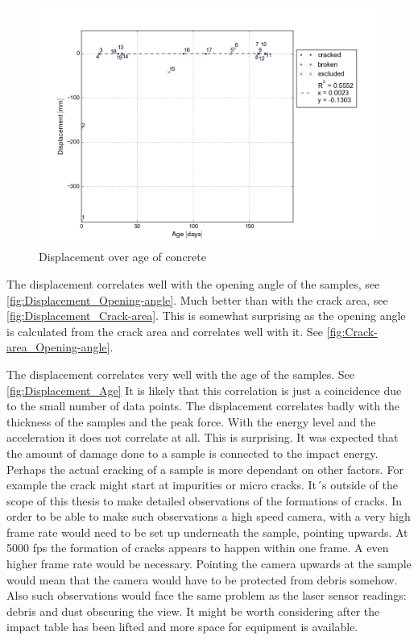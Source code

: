 \begin{figure}
    \centering
    \includegraphics[width=0.95 \linewidth]{./diagram/Displacement_Age}
    \caption{Displacement over age of concrete}
    \label{fig:Displacement_Age}
\end{figure}

The displacement correlates well with the opening angle of the samples, see \autoref{fig:Displacement_Opening-angle}. Much better than with the crack area, see \autoref{fig:Displacement_Crack-area}. This is somewhat surprising as the opening angle is calculated from the crack area and correlates well with it. See \autoref{fig:Crack-area_Opening-angle}.

The displacement correlates very well with the age of the samples. See \autoref{fig:Displacement_Age}
It is likely that this correlation is just a coincidence due to the small number of data points.
The displacement correlates badly with the thickness of the samples and the peak force. With the energy level and the acceleration it does not correlate at all. This is surprising. It was expected that the amount of damage done to a sample is connected to the impact energy. Perhaps the actual cracking of a sample is more dependant on other factors. For example the crack might start at impurities or micro cracks. It´s outside of the scope of this thesis to make detailed observations of the formations of cracks. In order to be able to make such observations a high speed camera, with a very high frame rate would need to be set up underneath the sample, pointing upwards. At 5000 fps the formation of cracks appears to happen within one frame. A even higher frame rate would be necessary. Pointing the camera upwards at the sample would mean that the camera would have to be protected from debris somehow. Also such observations would face the same problem as the laser sensor readings: debris and dust obscuring the view. It might be worth considering after the impact table has been lifted and more space for equipment is available. 

